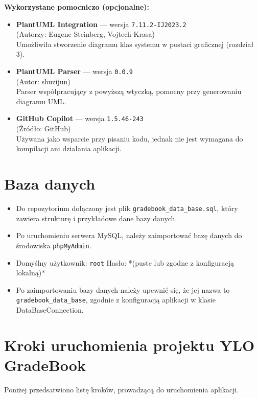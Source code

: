 \textbf{Wykorzystane pomocniczo (opcjonalne):}
\begin{itemize}
    \item \textbf{PlantUML Integration} — wersja \texttt{7.11.2-IJ2023.2} \\
    (Autorzy: Eugene Steinberg, Vojtech Krasa) \\
    Umożliwiła stworzenie diagramu klas systemu w postaci graficznej (rozdział 3).

    \item \textbf{PlantUML Parser} — wersja \texttt{0.0.9} \\
    (Autor: shuzijun) \\
    Parser współpracujący z powyższą wtyczką, pomocny przy generowaniu diagramu UML.

    \item \textbf{GitHub Copilot} — wersja \texttt{1.5.46-243} \\
    (Źródło: GitHub) \\
    Używana jako wsparcie przy pisaniu kodu, jednak nie jest wymagana do kompilacji ani działania aplikacji.
\end{itemize}


\section{Baza danych}

\begin{itemize}
    \item Do repozytorium dołączony jest plik \texttt{gradebook\_data\_base.sql}, który zawiera strukturę i przykładowe dane bazy danych.
    \item Po uruchomieniu serwera MySQL, należy zaimportować bazę danych do środowiska \texttt{phpMyAdmin}.
    \item Domyślny użytkownik: \texttt{root} \quad Hasło: *(puste lub zgodne z konfiguracją lokalną)*
    \item Po zaimportowaniu bazy danych należy upewnić się, że jej nazwa to \texttt{gradebook\_data\_base}, zgodnie z konfiguracją aplikacji w klasie DataBaseConnection.
\end{itemize}

\section{Kroki uruchomienia projektu YLO GradeBook}

Poniżej przedsatwiono listę kroków, prowadzącą do uruchomienia aplikacji.

